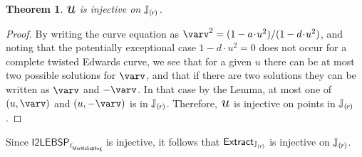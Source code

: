 \documentclass{article}
\newcommand{\introlist}{\needspace{15ex}}
\newtheorem{theorem}{Theorem}
\numberwithin{theorem}{subsection}
\newcommand{\smult}{\!\cdot\!}
\newcommand{\MerkleHashLengthSapling}{\mathsf{\ell_{MerkleSapling}}}
\newcommand{\Selectu}{\scalebox{1.53}{$u$}}
\newcommand{\subgroupr}{(\kern-0.075emr\kern-0.075em)}
\newcommand{\Extract}{\mathsf{Extract}}
\newcommand{\SubgroupJ}{\mathbb{J}_{\subgroupr}}
\newcommand{\ExtractJ}{\Extract_{\SubgroupJ}}
\newcommand{\ItoLEBSP}[1]{\mathsf{I2LEBSP}_{#1}}
\begin{document}
{\vspace{0.5ex}
\introlist
\begin{theorem} \label{thmselectuinjective}
$\Selectu$ is injective on $\SubgroupJ$.
\end{theorem}

\vspace{-3.5ex}
\begin{proof}
By writing the curve equation as
$\varv^2 = (1 - a \smult u^2) / (1 - d \smult u^2)$, and noting that the
potentially exceptional case $1 - d \smult u^2 = 0$ does not occur for a
complete twisted Edwards curve, we see that for a given $u$ there can be at
most two possible solutions for $\varv$, and that if there are two solutions
they can be written as $\varv$ and $-\varv$. In that case by the Lemma, at
most one of $(u, \varv)$ and $(u, -\varv)$ is in $\SubgroupJ$. Therefore,
$\Selectu$ is injective on points in $\SubgroupJ$.
\end{proof}

\vspace{-1ex}
Since $\ItoLEBSP{\MerkleHashLengthSapling}$ is injective, it follows that
$\ExtractJ$ is injective on $\SubgroupJ$.
}
\end{document}
